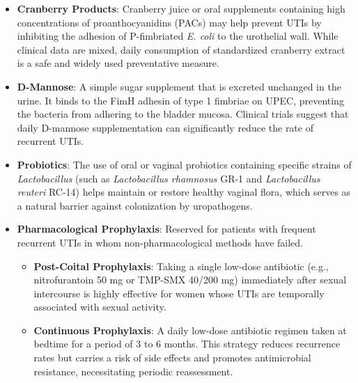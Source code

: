 \begin{itemize}
    \item \textbf{Cranberry Products}: Cranberry juice or oral supplements containing high concentrations of proanthocyanidins (PACs) may help prevent UTIs by inhibiting the adhesion of P-fimbriated \textit{E. coli} to the urothelial wall. While clinical data are mixed, daily consumption of standardized cranberry extract is a safe and widely used preventative measure.
    \item \textbf{D-Mannose}: A simple sugar supplement that is excreted unchanged in the urine. It binds to the FimH adhesin of type 1 fimbriae on UPEC, preventing the bacteria from adhering to the bladder mucosa. Clinical trials suggest that daily D-mannose supplementation can significantly reduce the rate of recurrent UTIs.
    \item \textbf{Probiotics}: The use of oral or vaginal probiotics containing specific strains of \textit{Lactobacillus} (such as \textit{Lactobacillus rhamnosus} GR-1 and \textit{Lactobacillus reuteri} RC-14) helps maintain or restore healthy vaginal flora, which serves as a natural barrier against colonization by uropathogens.
    \item \textbf{Pharmacological Prophylaxis}: Reserved for patients with frequent recurrent UTIs in whom non-pharmacological methods have failed.
    \begin{itemize}
        \item \textbf{Post-Coital Prophylaxis}: Taking a single low-dose antibiotic (e.g., nitrofurantoin 50 mg or TMP-SMX 40/200 mg) immediately after sexual intercourse is highly effective for women whose UTIs are temporally associated with sexual activity.
        \item \textbf{Continuous Prophylaxis}: A daily low-dose antibiotic regimen taken at bedtime for a period of 3 to 6 months. This strategy reduces recurrence rates but carries a risk of side effects and promotes antimicrobial resistance, necessitating periodic reassessment.
    \end{itemize}
\end{itemize}

